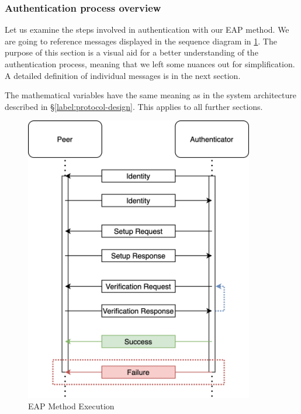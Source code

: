 \subsubsection{Authentication process overview}
Let us examine the steps involved in authentication with our EAP method. We are going to reference messages displayed in the sequence diagram in \ref{fig:eap-84}.
The purpose of this section is a visual aid for a better understanding of the authentication process, meaning that we left some nuances out for simplification. A detailed definition of individual messages is in the next section.

The mathematical variables have the same meaning as in the system architecture described in \S\ref{label:protocol-design}. This applies to all further sections.

\begin{figure}[h!]
	\centering
	\includegraphics[width=10cm]{images/eap-zkp}
	\caption{EAP Method Execution}
	\label{fig:eap-84}
\end{figure}

